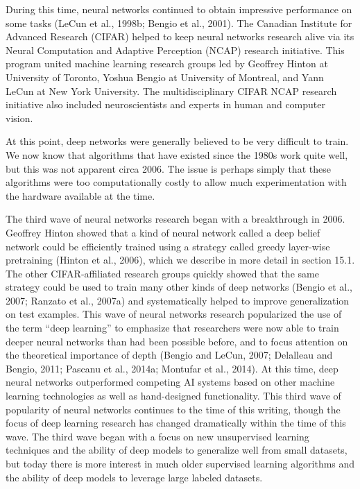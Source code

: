 \documentclass[11pt]{article}
\begin{document}
During this time, neural networks continued to obtain impressive performance on some tasks (LeCun et al., 1998b; Bengio et al., 2001).
The Canadian Institute for Advanced Research (CIFAR) helped to keep neural networks research alive via its Neural Computation and Adaptive Perception (NCAP) research initiative.
This program united machine learning research groups led by Geoﬀrey Hinton at University of Toronto, Yoshua Bengio at University of Montreal, and Yann LeCun at New York University.
The multidisciplinary CIFAR NCAP research initiative also included neuroscientists and experts in human and computer vision.

At this point, deep networks were generally believed to be very diﬃcult to train.
We now know that algorithms that have existed since the 1980s work quite well, but this was not apparent circa 2006.
The issue is perhaps simply that these algorithms were too computationally costly to allow much experimentation with the hardware available at the time.

The third wave of neural networks research began with a breakthrough in 2006.
Geoﬀrey Hinton showed that a kind of neural network called a deep belief network could be eﬃciently trained using a strategy called greedy layer-wise pretraining (Hinton et al., 2006), which we describe in more detail in section 15.1.
The other CIFAR-aﬃliated research groups quickly showed that the same strategy could be used to train many other kinds of deep networks (Bengio et al., 2007; Ranzato et al., 2007a) and systematically helped to improve generalization on test examples.
This wave of neural networks research popularized the use of the term “deep learning” to emphasize that researchers were now able to train deeper neural networks than had been possible before, and to focus attention on the theoretical importance of depth (Bengio and LeCun, 2007; Delalleau and Bengio, 2011; Pascanu et al., 2014a; Montufar et al., 2014).
At this time, deep neural networks outperformed competing AI systems based on other machine learning technologies as well as hand-designed functionality.
This third wave of popularity of neural networks continues to the time of this writing, though the focus of deep learning research has changed dramatically within the time of this wave.
The third wave began with a focus on new unsupervised learning techniques and the ability of deep models to generalize well from small datasets, but today there is more interest in much older supervised learning algorithms and the ability of deep models to leverage large labeled datasets.
\end{document}
